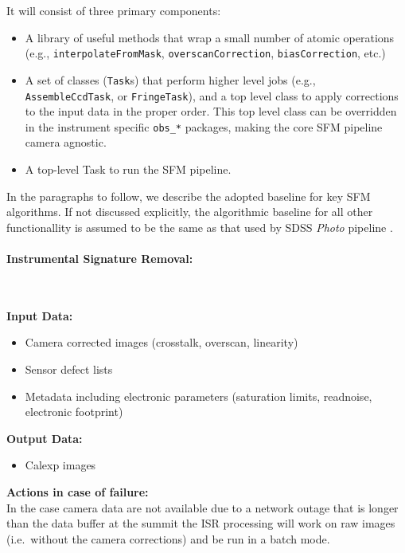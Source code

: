 It will consist of three primary components:
%
\begin{itemize}
\item A library of useful methods that wrap a small number of atomic operations (e.g., {\tt interpolateFromMask}, {\tt overscanCorrection}, {\tt biasCorrection}, etc.) %
\item A set of classes ({\tt Task}s) that perform higher level jobs
    (e.g., {\tt AssembleCcdTask}, or {\tt FringeTask}), and a top level class to apply corrections to the input data in the proper order. This top level class can be overridden in the instrument specific {\tt obs\_*} packages, making the core SFM pipeline camera agnostic.
\item A top-level Task to run the SFM pipeline.
\end{itemize}

In the paragraphs to follow, we describe the adopted baseline for key SFM algorithms. If not discussed explicitly, the algorithmic baseline for all other functionallity is assumed to be the same as that used by SDSS \emph{Photo} pipeline \cite{LuptonPhoto}.

\paragraph{Instrumental Signature Removal:}~

\noindent
{\bf Input Data:}
\begin{itemize}
\item Camera corrected images (crosstalk, overscan, linearity)
\item Sensor defect lists
\item Metadata including electronic parameters (saturation limits,
  readnoise, electronic footprint)
\end{itemize}

\noindent
{\bf Output Data:}
\begin{itemize}
\item Calexp images
\end{itemize}

\noindent 
{\bf Actions in case of failure:}\\
In the case camera data are not available due to a network outage that
is longer than the data buffer at the summit the ISR processing will
work on raw images (i.e.\ without the camera corrections) and be run
in a batch mode.


